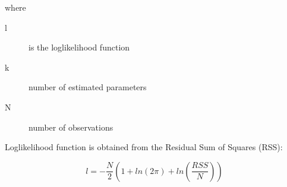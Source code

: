 \noindent where 

\begin{description}
\item[l] is the loglikelihood function
\item[k] number of estimated parameters
\item[N] number of observations
\end{description}

Loglikelihood function is obtained from the Residual Sum of Squares (RSS):

\begin{equation}
\label{eq:ll}
l = -\frac{N}{2} \left(1 + ln(2\pi) + ln\left(\frac{RSS}{N}\right)\right) 
\end{equation}

